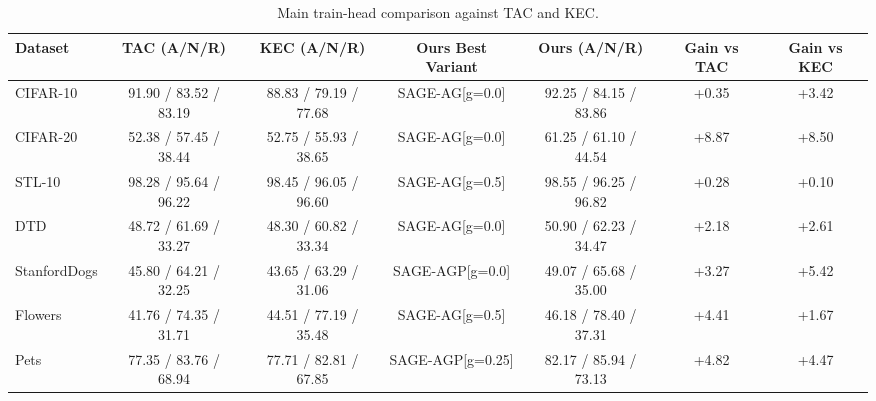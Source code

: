 \begin{table}[t]
\centering
\caption{Main train-head comparison against TAC and KEC.}
\label{tab:main_train}
\begin{tabular}{lcccccc}
\toprule
Dataset & TAC (A/N/R) & KEC (A/N/R) & Ours Best Variant & Ours (A/N/R) & Gain vs TAC & Gain vs KEC \\
\midrule
CIFAR-10 & 91.90 / 83.52 / 83.19 & 88.83 / 79.19 / 77.68 & SAGE-AG[g=0.0] & 92.25 / 84.15 / 83.86 & +0.35 & +3.42 \\
CIFAR-20 & 52.38 / 57.45 / 38.44 & 52.75 / 55.93 / 38.65 & SAGE-AG[g=0.0] & 61.25 / 61.10 / 44.54 & +8.87 & +8.50 \\
STL-10 & 98.28 / 95.64 / 96.22 & 98.45 / 96.05 / 96.60 & SAGE-AG[g=0.5] & 98.55 / 96.25 / 96.82 & +0.28 & +0.10 \\
DTD & 48.72 / 61.69 / 33.27 & 48.30 / 60.82 / 33.34 & SAGE-AG[g=0.0] & 50.90 / 62.23 / 34.47 & +2.18 & +2.61 \\
StanfordDogs & 45.80 / 64.21 / 32.25 & 43.65 / 63.29 / 31.06 & SAGE-AGP[g=0.0] & 49.07 / 65.68 / 35.00 & +3.27 & +5.42 \\
Flowers & 41.76 / 74.35 / 31.71 & 44.51 / 77.19 / 35.48 & SAGE-AG[g=0.5] & 46.18 / 78.40 / 37.31 & +4.41 & +1.67 \\
Pets & 77.35 / 83.76 / 68.94 & 77.71 / 82.81 / 67.85 & SAGE-AGP[g=0.25] & 82.17 / 85.94 / 73.13 & +4.82 & +4.47 \\
\bottomrule
\end{tabular}
\end{table}